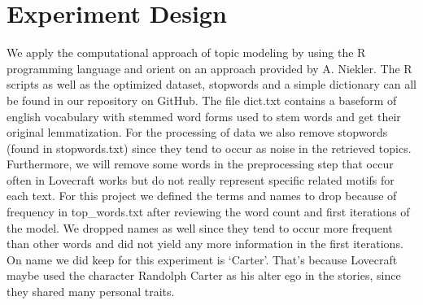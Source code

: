 \section{Experiment Design}

We apply the computational approach of topic modeling by using the R programming language and 
orient on an approach provided by A. Niekler. The R scripts as well as the optimized dataset, 
stopwords and a simple dictionary can all be found in our repository on GitHub. The file 
dict.txt contains a baseform of english vocabulary with stemmed word forms used to stem words 
and get their original lemmatization. For the processing of data we also remove stopwords 
(found in stopwords.txt) since they tend to occur as noise in the retrieved topics. 
Furthermore, we will remove some words in the preprocessing step that occur often in Lovecraft 
works but do not really represent specific related motifs for each text. For this project 
we defined the terms and names to drop because of frequency in top\_words.txt after reviewing 
the word count and first iterations of the model. We dropped names as well since they tend 
to occur more frequent than other words and did not yield any more information in the first 
iterations. On name we did keep for this experiment is ‘Carter’. That’s because Lovecraft 
maybe used the character Randolph Carter as his alter ego in the stories, since they shared 
many personal traits.\\

